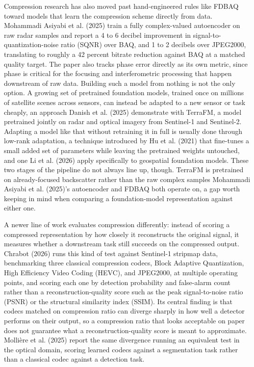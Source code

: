 \documentclass[11pt]{article}
\begin{document}
Compression research has also moved past hand-engineered rules like FDBAQ toward models that learn the compression scheme directly from data. Mohammadi Asiyabi et al. (2025) train a fully complex-valued autoencoder on raw radar samples and report a 4 to 6 decibel improvement in signal-to-quantization-noise ratio (SQNR) over BAQ, and 1 to 2 decibels over JPEG2000, translating to roughly a 42 percent bitrate reduction against BAQ at a matched quality target. The paper also tracks phase error directly as its own metric, since phase is critical for the focusing and interferometric processing that happen downstream of raw data. Building such a model from nothing is not the only option. A growing set of pretrained foundation models, trained once on millions of satellite scenes across sensors, can instead be adapted to a new sensor or task cheaply, an approach Danish et al. (2025) demonstrate with TerraFM, a model pretrained jointly on radar and optical imagery from Sentinel-1 and Sentinel-2. Adapting a model like that without retraining it in full is usually done through low-rank adaptation, a technique introduced by Hu et al. (2021) that fine-tunes a small added set of parameters while leaving the pretrained weights untouched, and one Li et al. (2026) apply specifically to geospatial foundation models. These two stages of the pipeline do not always line up, though. TerraFM is pretrained on already-focused backscatter rather than the raw complex samples Mohammadi Asiyabi et al. (2025)'s autoencoder and FDBAQ both operate on, a gap worth keeping in mind when comparing a foundation-model representation against either one.

A newer line of work evaluates compression differently: instead of scoring a compressed representation by how closely it reconstructs the original signal, it measures whether a downstream task still succeeds on the compressed output. Chrabot (2026) runs this kind of test against Sentinel-1 stripmap data, benchmarking three classical compression codecs, Block Adaptive Quantization, High Efficiency Video Coding (HEVC), and JPEG2000, at multiple operating points, and scoring each one by detection probability and false-alarm count rather than a reconstruction-quality score such as the peak signal-to-noise ratio (PSNR) or the structural similarity index (SSIM). Its central finding is that codecs matched on compression ratio can diverge sharply in how well a detector performs on their output, so a compression ratio that looks acceptable on paper does not guarantee what a reconstruction-quality score is meant to approximate. Molli\`ere et al. (2025) report the same divergence running an equivalent test in the optical domain, scoring learned codecs against a segmentation task rather than a classical codec against a detection task.
\end{document}
